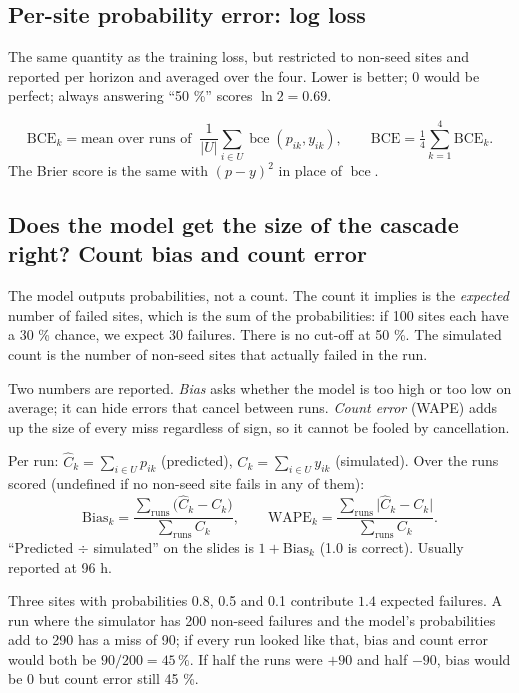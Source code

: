 \documentclass[11pt]{article}
\newcommand{\bce}{\operatorname{bce}}
\begin{document}
\subsection{Per-site probability error: log loss}\label{sub:bce}

The same quantity as the training loss, but restricted to non-seed sites and reported per horizon and averaged over the four. Lower is better; 0 would be perfect; always answering ``50 \%'' scores $\ln 2 = 0.69$.
\begin{maths}
\[
\mathrm{BCE}_k=\text{mean over runs of }\ \frac{1}{|U|}\sum_{i\in U}\bce(p_{ik},y_{ik}),\qquad \mathrm{BCE}=\tfrac14\sum_{k=1}^4\mathrm{BCE}_k.
\]
The Brier score is the same with $(p-y)^2$ in place of $\bce$.
\end{maths}

\subsection{Does the model get the size of the cascade right? Count bias and count error}\label{sub:count}

The model outputs probabilities, not a count. The count it implies is the \emph{expected} number of failed sites, which is the sum of the probabilities: if 100 sites each have a 30 \% chance, we expect 30 failures. There is no cut-off at 50 \%. The simulated count is the number of non-seed sites that actually failed in the run.

Two numbers are reported. \emph{Bias} asks whether the model is too high or too low on average; it can hide errors that cancel between runs. \emph{Count error} (WAPE) adds up the size of every miss regardless of sign, so it cannot be fooled by cancellation.

\begin{maths}
Per run: $\hat C_k=\sum_{i\in U}p_{ik}$ (predicted), $C_k=\sum_{i\in U}y_{ik}$ (simulated). Over the runs scored (undefined if no non-seed site fails in any of them):
\[
\mathrm{Bias}_k=\frac{\sum_{\text{runs}}\big(\hat C_k-C_k\big)}{\sum_{\text{runs}}C_k},\qquad
\mathrm{WAPE}_k=\frac{\sum_{\text{runs}}\big|\hat C_k-C_k\big|}{\sum_{\text{runs}}C_k}.
\]
``Predicted $\div$ simulated'' on the slides is $1+\mathrm{Bias}_k$ (1.0 is correct). Usually reported at 96 h.
\end{maths}

\begin{example}
Three sites with probabilities 0.8, 0.5 and 0.1 contribute $1.4$ expected failures. A run where the simulator has 200 non-seed failures and the model's probabilities add to 290 has a miss of 90; if every run looked like that, bias and count error would both be $90/200=45\,\%$. If half the runs were $+90$ and half $-90$, bias would be 0 but count error still 45 \%.
\end{example}
\end{document}
